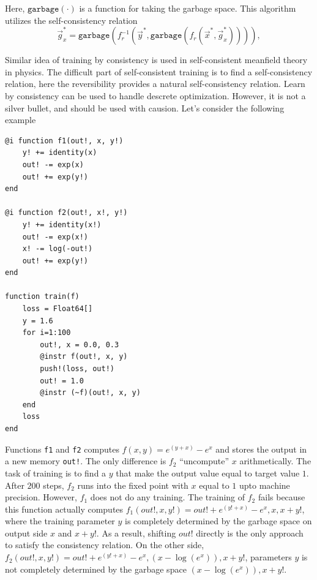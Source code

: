 \documentclass[aps,twocolumn,longbibliography,english,superscriptaddress,prr]{revtex4-1}
\newcommand{\<}{\langle}
\renewcommand{\>}{\rangle}
\newcommand{\vx}{{\vec x}}
\newcommand{\vg}{{\vec g}}
\newcommand{\vy}{{\vec y}}
\newcommand{\garbage}{{\texttt{garbage}}}
\theoremstyle{definition}\newtheorem{definition}{\textit{Definition}}
\begin{document}
Here, $\garbage(\cdot)$ is a function for taking the garbage space.
This algorithm utilizes the self-consistency relation
\begin{equation}\label{eq:selfconsistent}
    \vg_x^* = \garbage(f_r^{-1}(\vy^*, \garbage(f_r(\vx^*, \vg^*_x)))),
\end{equation}

Similar idea of training by consistency is used in self-consistent meanfield theory~\cite{} in physics.
The difficult part of self-consistent training is to find a self-consistency relation, here the reversibility provides a natural self-consistency relation.
Learn by consistency can be used to handle descrete optimization. However, it is not a silver bullet, and should be used with causion.
Let's consider the following example

\begin{minipage}{.44\textwidth}
\begin{lstlisting}[basicstyle=\small\ttfamily,columns=fullflexible]
@i function f1(out!, x, y!)
    y! += identity(x)
    out! -= exp(x)
    out! += exp(y!)
end

@i function f2(out!, x!, y!)
    y! += identity(x!)
    out! -= exp(x!)
    x! -= log(-out!)
    out! += exp(y!)
end

function train(f)
    loss = Float64[]
    y = 1.6
    for i=1:100
        out!, x = 0.0, 0.3
        @instr f(out!, x, y)
        push!(loss, out!)
        out! = 1.0
        @instr (~f)(out!, x, y)
    end
    loss
end
\end{lstlisting}
\end{minipage}

Functions \texttt{f1} and \texttt{f2} computes $f(x, y) = e^{(y+x)} - e^x$ and stores the output in a new memory \texttt{out!}.
The only difference is $f_2$ ``uncompute'' $x$ arithmetically.
The task of training is to find a $y$ that make the output value equal to target value $1$.
After $200$ steps, $f_2$ runs into the fixed point with $x$ equal to $1$ upto machine precision.
However, $f_1$ does not do any training.
The training of $f_2$ fails because this function actually computes $f_1(out!, x, y!) = out! + e^{(y!+x)} - e^x, x, x+y!$, where the training parameter $y$ is completely determined by the garbage space on output side $x$ and $x+y!$. As a result, shifting $out!$ directly is the only approach to satisfy the consistency relation. On the other side, $f_2(out!, x, y!) = out! + e^{(y!+x)} - e^x, \left(x-\log(e^x)\right), x+y!$, parameters $y$ is not completely determined by the garbage space $\left(x-\log(e^x)\right), x+y!$.
\end{document}
